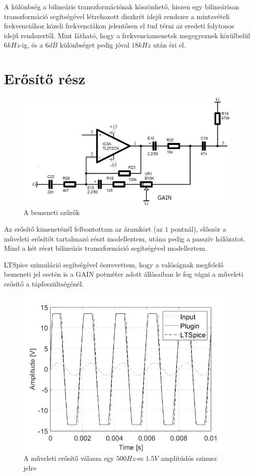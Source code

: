 A különbség a bilineáris transzformációnak köszönhető, hiszen egy bilineárisan transzformáció segítségével létrehozott 
diszkrét idejű rendszer a mintavételi frekvenciához 
közeli frekvenciákon jelentősen el tud térni az eredeti folytonos idejű rendszertől. 
Mint látható, hogy a frekvenciamenetek megegyeznek körülbelül $6kHz$-ig, 
és a $6dB$ különbséget pedig jóval $18kHz$ után éri el.

\section{Erősítő rész}
\begin{figure}[H]
    \centering
    \includegraphics[scale=0.35]{figures/stage2.png}
    \caption{A bemeneti szűrők}
\end{figure}
Az erősítő kimeneténél felbontottam az áramkört (az $1$ pontnál), először a műveleti erősítőt tartalmazó részt 
modelleztem, utána pedig a passzív hálózatot. Mind a két részt bilineáris transzformáció segítségével modelleztem. 

LTSpice szimuláció segítségével észrevettem, hogy a valóságnak megfelelő bemeneti jel esetén is a 
GAIN potméter adott állásaiban le fog vágni a műveleti erősítő a tápfeszültségénél. 

\begin{figure}[H]
    \centering
    \includegraphics[scale=0.5]{figures/stage2plot.png}
    \caption{A műveleti erősítő válasza egy $500Hz$-es $1.5V$ amplitúdós szinusz jelre}
    \label{again}
\end{figure}

